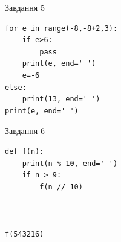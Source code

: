 \documentclass[12pt, ukrainian]{article}
\begin{document}
{\vspace{15mm}
\begin{minipage}[t]{9.7cm}                
{\begin{center}Завдання {5}\end{center}}
\begin{verbatim}
for e in range(-8,-8+2,3):
    if e>6:
        pass
    print(e, end=' ')
    e=-6
else:
    print(13, end=' ')
print(e, end=' ')
\end{verbatim}     
\end{minipage}
\vline \hspace{8mm}
\begin{minipage}[t]{8.0cm}                
{\begin{center}Завдання {6}\end{center}}
\begin{verbatim}
def f(n):
    print(n % 10, end=' ')
    if n > 9:
        f(n // 10)
    


f(543216)
\end{verbatim}     
\end{minipage}

}
\newpage
\end{document}
